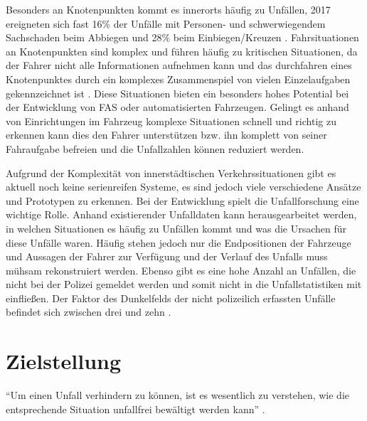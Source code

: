 Besonders an Knotenpunkten kommt es innerorts häufig zu Unfällen, 2017 ereigneten sich fast 16\% der Unfälle mit Personen- und schwerwiegendem Sachschaden beim Abbiegen und 28\% beim Einbiegen/Kreuzen \parencite[S.68]{StatistischesBundesamt.2018b}. Fahrsituationen an Knotenpunkten sind komplex und führen häufig zu kritischen Situationen, da der Fahrer nicht alle Informationen aufnehmen kann \parencite[S.2]{Gerstenberger.17.02.2015} und das durchfahren eines Knotenpunktes durch ein komplexes Zusammenspiel von vielen Einzelaufgaben gekennzeichnet ist \parencite[S.51]{Zademach.24.09.2015}. Diese Situationen bieten ein besonders hohes Potential bei der Entwicklung von FAS oder automatisierten Fahrzeugen. Gelingt es anhand von Einrichtungen im Fahrzeug komplexe Situationen schnell und richtig zu erkennen kann dies den Fahrer unterstützen bzw. ihn komplett von seiner Fahraufgabe befreien und die Unfallzahlen können reduziert werden. 

Aufgrund der Komplexität von innerstädtischen Verkehrssituationen gibt es aktuell noch keine serienreifen Systeme, es sind jedoch viele verschiedene Ansätze und Prototypen zu erkennen. Bei der Entwicklung spielt die Unfallforschung eine wichtige Rolle. Anhand existierender Unfalldaten kann herausgearbeitet werden, in welchen Situationen es häufig zu Unfällen kommt und was die Ursachen für diese Unfälle waren. Häufig stehen jedoch nur die Endpositionen der Fahrzeuge und Aussagen der Fahrer zur Verfügung und der Verlauf des Unfalls muss mühsam rekonstruiert werden. Ebenso gibt es eine hohe Anzahl an Unfällen, die nicht bei der Polizei gemeldet werden und somit nicht in die Unfallstatistiken mit einfließen. Der Faktor des Dunkelfelds der nicht polizeilich erfassten Unfälle befindet sich zwischen drei und zehn \parencite[S.151]{Huguenin.2017}.

\section{Zielstellung}
\enquote{Um einen Unfall verhindern zu können, ist es wesentlich zu verstehen, wie die entsprechende Situation unfallfrei bewältigt werden kann} \parencite[S.8]{Vollrath.2006}.

